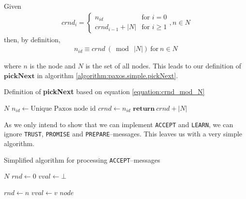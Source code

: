 Given
\begin{gather}
  crnd_i = \left\{
             \begin{array}{ll}
               n_{id} & \mbox{for } i = 0 \\
               crnd_{i-1} + |N| & \mbox{for } i \geq 1
             \end{array}
           \right. , n \in N
  \label{equation:crnd_i}
\end{gather}
then, by definition,
\begin{gather}
  n_{id} \equiv crnd\ (\bmod\ |N|)\ \text{for}\ n \in N
  \label{equation:crnd_mod_N}
\end{gather}

where $n$ is the node and $N$ is the set of all nodes.  This leads to our
definition of $\textbf{pickNext}$ in algorithm
\ref{algorithm:paxos.simple.pickNext}.

\begin{algorithm}
  \caption{Definition of \textbf{pickNext} based on equation \ref{equation:crnd_mod_N}}
  \label{algorithm:paxos.simple.pickNext}
  \begin{algorithmic}
    \State $N$ 
    \State $n_{id} \gets \text{Unique Paxos node id}$
    \State $crnd \gets n_{id}$ 
    \State
      \State $\textbf{return}\ crnd + |N|$ 
    \EndFunction
  \end{algorithmic}
\end{algorithm}

As we only intend to show that we can implement \texttt{ACCEPT} and
\texttt{LEARN}, we can ignore \texttt{TRUST}, \texttt{PROMISE} and
\texttt{PREPARE}--messages.  This leaves us with a very simple algorithm.

\begin{algorithm}
  \caption{Simplified algorithm for processing \texttt{ACCEPT}--messages}
  \label{algorithm:paxos.simple.acceptor}
  \begin{algorithmic}
    \State $N$
    \State $rnd \gets 0$ 
    \State $vval \gets \bot$ 
    \State

        \State $rnd\gets n$
        \State $vval\gets v$ 
           \State {}
                         {$node$}
        \EndForIn
      \EndIf
    \EndOn
  \end{algorithmic}
\end{algorithm}

